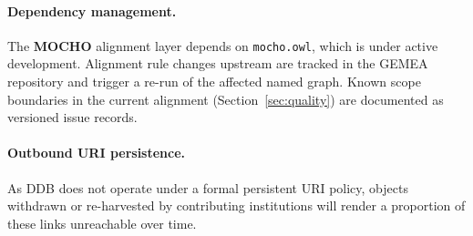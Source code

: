 \paragraph{Dependency management.}
The \textbf{MOCHO} alignment layer depends on \texttt{mocho.owl}, which is under active development.
Alignment rule changes upstream are tracked in the GEMEA repository and trigger a re-run of the affected named graph.
Known scope boundaries in the current alignment (Section~\ref{sec:quality}) are documented as versioned issue records.

\paragraph{Outbound URI persistence.}
As DDB does not operate under a formal persistent URI policy, objects withdrawn or re-harvested by contributing institutions will render a proportion of these links unreachable over time.

